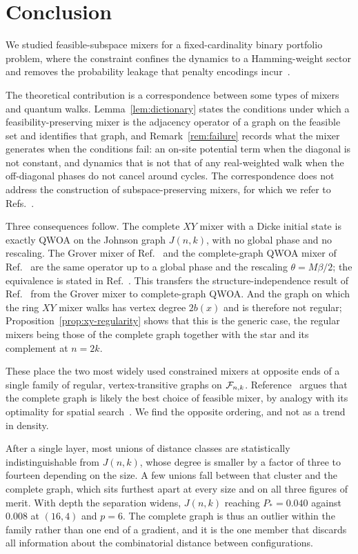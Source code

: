 \section{\label{sec:conclusion}Conclusion}

We studied feasible-subspace mixers for a fixed-cardinality binary portfolio
problem, where the constraint confines the dynamics to a Hamming-weight sector
and removes the probability leakage that penalty encodings
incur~\cite{Hadfield2019,Slate2021}.

The theoretical contribution is a correspondence between some types of mixers and quantum walks. Lemma~\ref{lem:dictionary} states
the conditions under which a feasibility-preserving mixer is the adjacency
operator of a graph on the feasible set and identifies that graph, and
Remark~\ref{rem:failure} records what the mixer generates when the conditions
fail: an on-site potential term when the diagonal is not constant, and
dynamics that is not that of any real-weighted walk when the off-diagonal
phases do not cancel around cycles. The correspondence does not address the
construction of subspace-preserving mixers, for which we refer to
Refs.~\cite{Fuchs2022,Fuchs2024}.

Three consequences follow. The complete $XY$ mixer with a Dicke initial state
is exactly QWOA on the Johnson graph $J(n,k)$, with no global phase and no
rescaling. The Grover mixer of Ref.~\cite{Bartschi2020} and the
complete-graph QWOA mixer of Ref.~\cite{Slate2021} are the same operator up to
a global phase and the rescaling $\theta=M\beta/2$; the equivalence is stated
in Ref.~\cite{Bridi2024}. This transfers the
structure-independence result of Ref.~\cite{Bridi2024} from the Grover mixer
to complete-graph QWOA. And the graph on which the ring $XY$ mixer walks has
vertex degree $2b(x)$ and is therefore not regular;
Proposition~\ref{prop:xy-regularity} shows that this is the generic case, the
regular mixers being those of the complete graph together with the star and
its complement at $n=2k$.

These place the two most widely used constrained mixers at opposite ends of
a single family of regular, vertex-transitive graphs on $\mathcal{F}_{n,k}$.
Reference~\cite{Slate2021} argues that the complete graph is likely the
best choice of feasible mixer, by analogy with its optimality for spatial
search~\cite{Zalka1999,Childs2004,Roland2003}. We find the opposite
ordering, and not as a trend in density.

After a single layer, most unions of distance classes are statistically
indistinguishable from $J(n,k)$, whose degree is smaller by a factor of
three to fourteen depending on the size. A few unions fall between that
cluster and the complete graph, which sits furthest apart at every size and
on all three figures of merit. With depth the separation widens, $J(n,k)$
reaching $P_*=0.040$ against $0.008$ at $(16,4)$ and $p=6$. The complete
graph is thus an outlier within the family rather than one end of a
gradient, and it is the one member that discards all information about the
combinatorial distance between configurations.

